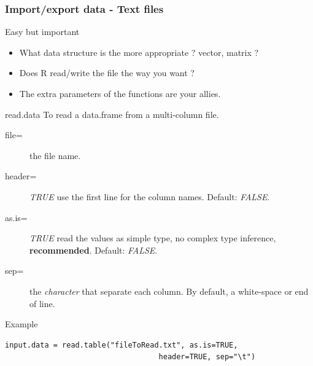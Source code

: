 \documentclass[10pt]{beamer}
\newenvironment{xframe}[2][]
  {\begin{frame}[fragile,environment=xframe,#1]
  \frametitle{#2}}
  {\end{frame}}
\begin{document}
\begin{xframe}[shrink=5]{Import/export data - Text files}
  \begin{block}{Easy but important}
    \begin{itemize}
    \item What data structure is the more appropriate ? {\sf vector}, {\sf matrix} ?
    \item Does R read/write the file the way you want ?
    \item The extra parameters of the functions are your allies.
    \end{itemize}
  \end{block}
  \begin{block}{{\sf read.data}}
    To read a {\sf data.frame} from a multi-column file.
    \begin{description}
    \item[file=] the file name.
    \item[header=] {\it TRUE} use the first line for the column names. Default: {\it FALSE}.
    \item[as.is=] {\it TRUE} read the values as simple type, no complex type inference, {\bf recommended}. Default: {\it FALSE}. 
    \item[sep=] the {\it character} that separate each column. By default, a white-space or end of line.
    \end{description}
  \end{block}
  \begin{exampleblock}{Example}
\begin{verbatim}
input.data = read.table("fileToRead.txt", as.is=TRUE,
                                   header=TRUE, sep="\t")
\end{verbatim}  
  \end{exampleblock}
\end{xframe}

\end{document}
